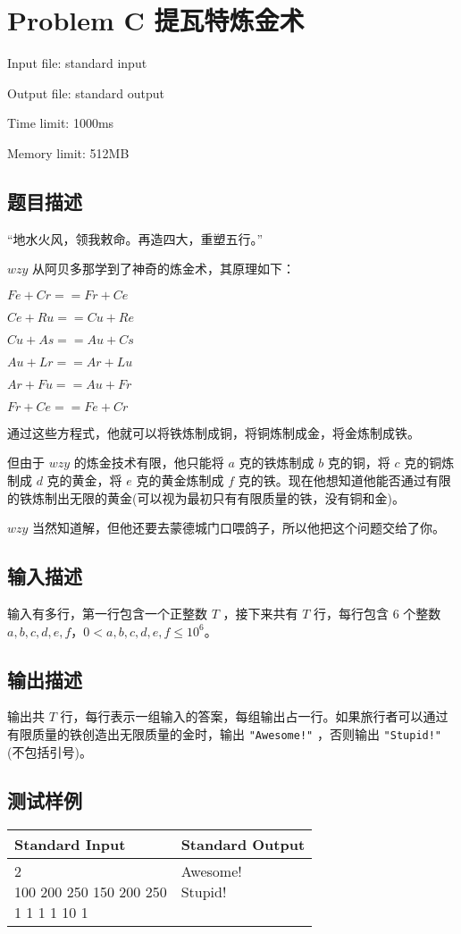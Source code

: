 \newpage
\section{Problem C 提瓦特炼金术}
{ \limitfont{}
Input file: standard input \par
Output file: standard output \par
Time limit: 1000ms \par
Memory limit: 512MB \par
}
\subsection*{题目描述}

{\kaishu “地水火风，领我敕命。再造四大，重塑五行。”}

$wzy$ 从阿贝多那学到了神奇的炼金术，其原理如下：

$Fe + Cr == Fr +Ce$

$Ce + Ru == Cu +Re$

$Cu + As = = Au + Cs$

$Au+Lr==Ar+Lu$

$Ar+Fu==Au+Fr$

$Fr+Ce==Fe+Cr$

通过这些方程式，他就可以将铁炼制成铜，将铜炼制成金，将金炼制成铁。

但由于 $wzy$ 的炼金技术有限，他只能将 $a$ 克的铁炼制成 $b$ 克的铜，将 $c$ 克的铜炼制成 $d$ 克的黄金，将 $e$ 克的黄金炼制成 $f$ 克的铁。现在他想知道他能否通过有限的铁炼制出无限的黄金(可以视为最初只有有限质量的铁，没有铜和金)。

$wzy$ 当然知道解，但他还要去蒙德城门口喂鸽子，所以他把这个问题交给了你。

\subsection*{输入描述}

输入有多行，第一行包含一个正整数 $T$ ，接下来共有 $T$ 行，每行包含 $6$ 个整数 $a,b,c,d,e,f$，$0<a,b,c,d,e,f\le10^6$。

\subsection*{输出描述}

输出共 $T$ 行，每行表示一组输入的答案，每组输出占一行。如果旅行者可以通过有限质量的铁创造出无限质量的金时，输出 \lstinline|"Awesome!"| ，否则输出 \lstinline|"Stupid!"| (不包括引号)。

\subsection*{测试样例}

\begin{table}[H]
\begin{tabularx}{\textwidth}{|X|X|}
    \hline
    \textbf{Standard Input} & \textbf{Standard Output} \\ 
    \hline
    \tablecell{2\\ 100 200 250 150 200 250\\ 1 1 1 1 10 1 \\} & 
    \tablecell{Awesome!\\ Stupid! \\ \\} \\ 
    \hline
\end{tabularx}
\end{table}